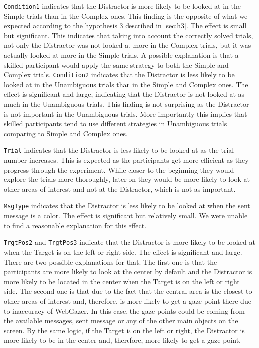 \texttt{Condition1} indicates that the Distractor is more likely to be looked at in the Simple trials than in the Complex ones. This finding is the opposite of what we expected according to the hypothesis 3 described in \autoref{sec:h3}. The effect is small but significant. This indicates that taking into account the correctly solved trials, not only the Distractor was not looked at more in the Complex trials, but it was actually looked at more in the Simple trials. A possible explanation is that a skilled participant would apply the same strategy to both the Simple and Complex trials. \texttt{Condition2} indicates that the Distractor is less likely to be looked at in the Unambiguous trials than in the Simple and Complex ones. The effect is significant and large, indicating that the Distractor is not looked at as much in the Unambiguous trials. This finding is not surprising as the Distractor is not important in the Unambiguous trials. More importantly this implies that skilled participants tend to use different strategies in Unambiguous trials comparing to Simple and Complex ones.

\texttt{Trial} indicates that the Distractor is less likely to be looked at as the trial number increases. This is expected as the participants get more efficient as they progress through the experiment. While closer to the beginning they would explore the trials more thoroughly, later on they would be more likely to look at other areas of interest and not at the Distractor, which is not as important. 

\texttt{MsgType} indicates that the Distractor is less likely to be looked at when the sent message is a color. The effect is significant but relatively small. We were unable to find a reasonable explanation for this effect.

\texttt{TrgtPos2} and \texttt{TrgtPos3} indicate that the Distractor is more likely to be looked at when the Target is on the left or right side. The effect is significant and large. There are two possible explanations for that. The first one is that the participants are more likely to look at the center by default and the Distractor is more likely to be located in the center when the Target is on the left or right side. The second one is that due to the fact that the central area is the closest to other areas of interest and, therefore, is more likely to get a gaze point there due to inaccuracy of WebGazer. In this case, the gaze points could be coming from the available messages, sent message or any of the other main objects on the screen. By the same logic, if the Target is on the left or right, the Distractor is more likely to be in the center and, therefore, more likely to get a gaze point.

